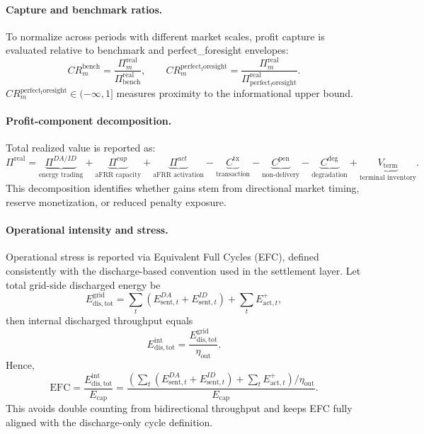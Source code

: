 \paragraph{Capture and benchmark ratios.}
To normalize across periods with different market scales, profit capture is evaluated relative to benchmark and perfect_foresight envelopes:
\begin{equation}
    CR^{\mathrm{bench}}_{m} = \frac{\Pi^{\mathrm{real}}_{m}}{\Pi^{\mathrm{real}}_{\mathrm{bench}}},
    \qquad
    CR^{\mathrm{perfect_foresight}}_{m} = \frac{\Pi^{\mathrm{real}}_{m}}{\Pi^{\mathrm{real}}_{\mathrm{perfect_foresight}}}.
\end{equation}
$CR^{\mathrm{perfect_foresight}}_{m}\in(-\infty,1]$ measures proximity to the informational upper bound.

\paragraph{Profit-component decomposition.}
Total realized value is reported as:
\begin{equation}
    \Pi^{\mathrm{real}} =
    \underbrace{\Pi^{DA/ID}}_{\text{energy trading}}
    +
    \underbrace{\Pi^{cap}}_{\text{aFRR capacity}}
    +
    \underbrace{\Pi^{act}}_{\text{aFRR activation}}
    -
    \underbrace{C^{\mathrm{tx}}}_{\text{transaction}}
    -
    \underbrace{C^{\mathrm{pen}}}_{\text{non-delivery}}
    -
    \underbrace{C^{\mathrm{deg}}}_{\text{degradation}}
    +
    \underbrace{V_{\mathrm{term}}}_{\text{terminal inventory}}.
\end{equation}
This decomposition identifies whether gains stem from directional market timing, reserve monetization, or reduced penalty exposure.

\paragraph{Operational intensity and stress.}
Operational stress is reported via Equivalent Full Cycles (EFC), defined consistently with the discharge-based convention used in the settlement layer. Let total grid-side discharged energy be
\[
    E^{\mathrm{grid}}_{\mathrm{dis,tot}}
    =
    \sum_t \left(E^{DA}_{\mathrm{sent},t}+E^{ID}_{\mathrm{sent},t}\right)
    +
    \sum_t E^{+}_{\mathrm{act},t},
\]
then internal discharged throughput equals
\[
    E^{\mathrm{int}}_{\mathrm{dis,tot}}
    =
    \frac{E^{\mathrm{grid}}_{\mathrm{dis,tot}}}{\eta_{\text{out}}}.
\]
Hence,
\begin{equation}\label{eq:efc-corrected}
    \mathrm{EFC}
    =
    \frac{E^{\mathrm{int}}_{\mathrm{dis,tot}}}{E_{\text{cap}}}
    =
    \frac{\left(\sum_t \left(E^{DA}_{\mathrm{sent},t}+E^{ID}_{\mathrm{sent},t}\right)+\sum_t E^{+}_{\mathrm{act},t}\right)/\eta_{\text{out}}}{E_{\text{cap}}}.
\end{equation}
This avoids double counting from bidirectional throughput and keeps EFC fully aligned with the discharge-only cycle definition.

